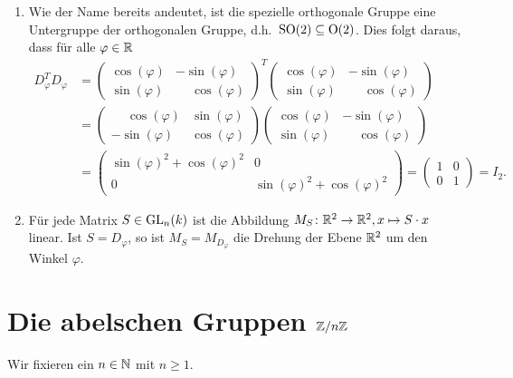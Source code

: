 \begin{bem}
 \begin{enumerate}[leftmargin=*]
  \item
   Wie der Name bereits andeutet, ist die spezielle orthogonale Gruppe eine Untergruppe der orthogonalen Gruppe, d.h.\ $\mathrm{SO}(2) \subseteq \mathrm{O}(2)$. Dies folgt daraus, dass für alle $\varphi \in \mathbb{R}$
   \begin{align*}
    D_\varphi^T D_\varphi
    &=
    \begin{pmatrix}
     \cos(\varphi) &           -\sin(\varphi) \\
     \sin(\varphi) & \phantom{-}\cos(\varphi)
    \end{pmatrix}^T
    \begin{pmatrix}
     \cos(\varphi) &           -\sin(\varphi) \\
     \sin(\varphi) & \phantom{-}\cos(\varphi)
    \end{pmatrix} \\
    &=
    \begin{pmatrix}
     \phantom{-}\cos(\varphi) & \sin(\varphi) \\
               -\sin(\varphi) & \cos(\varphi)
    \end{pmatrix}
    \begin{pmatrix}
     \cos(\varphi) & -\sin(\varphi) \\
     \sin(\varphi) & \phantom{-}\cos(\varphi)
    \end{pmatrix} \\
    &=
    \begin{pmatrix}
     \sin(\varphi)^2 + \cos(\varphi)^2 & 0 \\
     0 & \sin(\varphi)^2 + \cos(\varphi)^2
    \end{pmatrix}
    =
    \begin{pmatrix}
     1 & 0 \\
     0 & 1
    \end{pmatrix}
    = I_2.
   \end{align*}
  \item
   Für jede Matrix $S \in \mathrm{GL}_n(k)$ ist die Abbildung $M_S \colon \mathbb{R}^2 \to \mathbb{R}^2, x \mapsto S \cdot x$ linear. Ist $S = D_\varphi$, so ist $M_S = M_{D_\varphi}$ die Drehung der Ebene $\mathbb{R}^2$ um den Winkel $\varphi$.
 \end{enumerate}
\end{bem}





\section{Die abelschen Gruppen \texorpdfstring{$\mathbb{Z}/n\mathbb{Z}$}{Z/nZ}}\label{ss: ZnZ}
Wir fixieren ein $n \in \mathbb{N}$ mit $n \geq 1$.



